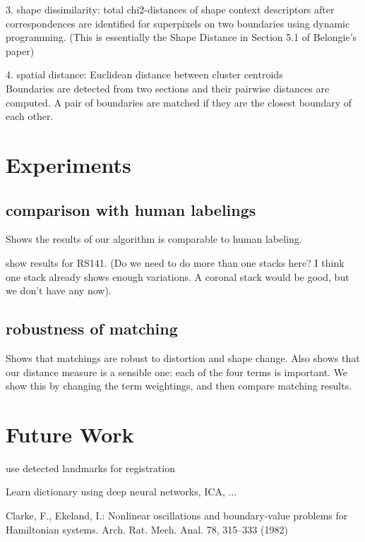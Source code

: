 \documentclass{llncs}
\begin{document}
3. shape dissimilarity: total chi2-distances of shape context descriptors after correspondences are identified for superpixels on two boundaries using dynamic programming. (This is essentially the Shape Distance in Section 5.1 of Belongie's paper)

4. spatial distance: Euclidean distance between cluster centroids
\\

Boundaries are detected from two sections and their pairwise distances are computed. A pair of boundaries are matched if they are the closest boundary of each other.

\section{Experiments}

\subsection{comparison with human labelings}

Shows the results of our algorithm is comparable to human labeling.

show results for RS141. (Do we need to do more than one stacks here? I think one stack already shows enough variations. A coronal stack would be good, but we don't have any now).

\subsection{robustness of matching}

Shows that matchings are robust to distortion and shape change.
Also shows that our distance measure is a sensible one: each of the four terms is important. We show this by changing the term weightings, and then compare matching results.

\section{Future Work}

use detected landmarks for registration

Learn dictionary using deep neural networks, ICA, ...



%
%
\begin{thebibliography}{5}
%
Clarke, F., Ekeland, I.:
Nonlinear oscillations and
boundary-value problems for Hamiltonian systems.
Arch. Rat. Mech. Anal. 78, 315--333 (1982)

\end{thebibliography}
\end{document}
